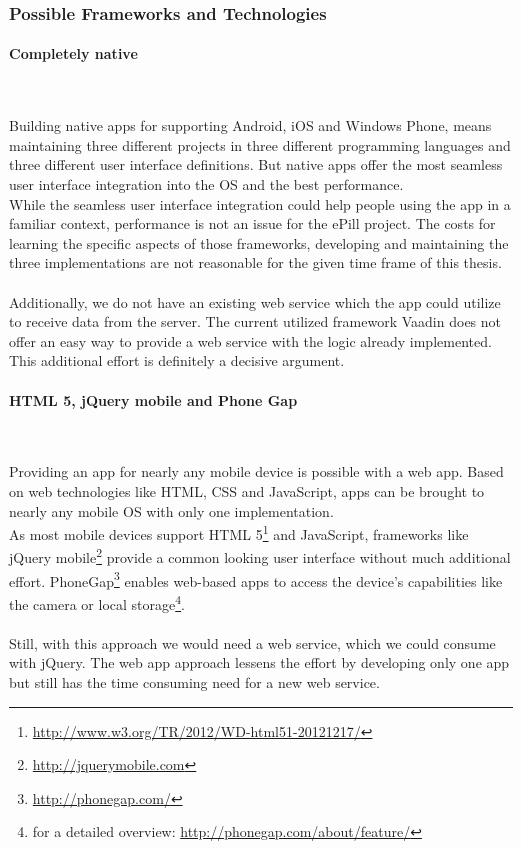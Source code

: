 \subsubsection{Possible Frameworks and Technologies}
\paragraph{Completely native}$\;$

\vspace{0.75em}
Building native apps for supporting Android, iOS and Windows Phone, means maintaining three different projects in three different programming languages and three different user interface definitions. But native apps offer the most seamless user interface integration into the OS and the best performance. 
\\
While the seamless user interface integration could help people using the app in a familiar context, performance is not an issue for the ePill project. The costs for learning the specific aspects of those frameworks, developing and maintaining the three implementations are not reasonable for the given time frame of this thesis.
\\
\\
Additionally, we do not have an existing web service which the app could utilize to receive data from the server. The current utilized framework Vaadin does not offer an easy way to provide a web service with the logic already implemented. This additional effort is definitely a decisive argument.

\paragraph{HTML 5, jQuery mobile and Phone Gap}$\;$

\vspace{0.75em}
Providing an app for nearly any mobile device is possible with a web app. Based on web technologies like HTML, CSS and JavaScript, apps can be brought to nearly any mobile OS with only one implementation.
\\
As most mobile devices support HTML 5\footnote{\url{http://www.w3.org/TR/2012/WD-html51-20121217/}} and JavaScript, frameworks like jQuery mobile\footnote{\url{http://jquerymobile.com}} provide a common looking user interface without much additional effort. PhoneGap\footnote{\url{http://phonegap.com/}} enables web-based apps to access the device's capabilities like the camera or local storage\footnote{for a detailed overview: \url{http://phonegap.com/about/feature/}}.
\\
\\
Still, with this approach we would need a web service, which we could consume with jQuery. The web app approach lessens the effort by developing only one app but still has the time consuming need for a new web service.

